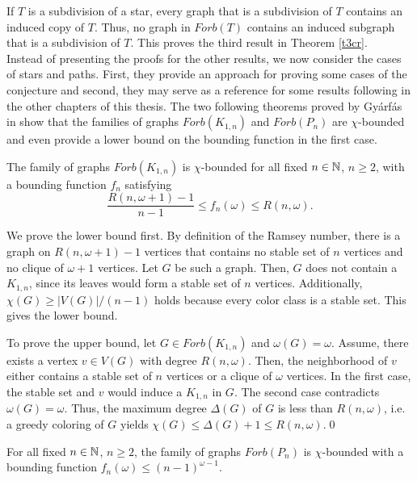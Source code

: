 If $T$ is a subdivision of a star, every graph that is a subdivision of $T$ contains an induced copy of $T$. Thus, no graph in $\textit{Forb}(T)$ contains an induced subgraph that is a subdivision of $T$. This proves the third result in Theorem \ref{t3cr}.\\

Instead of presenting the proofs for the other results, we now consider the cases of stars and paths. First, they provide an approach for proving some cases of the conjecture and second, they may serve as a reference for some results following in the other chapters of this thesis. The two following theorems proved by Gyárfás in \cite{Gy87} show that the families of graphs $\textit{Forb}(K_{1,n})$ and $\textit{Forb}(P_n)$ are $\chi$-bounded and even provide a lower bound on the bounding function in the first case.

\begin{thm} The family of graphs $\textit{Forb}(K_{1,n})$ is $\chi$-bounded for all fixed $n \in\mathbb{N}$, $n\geq 2$, with a bounding function $f_n$ satisfying \[\dfrac{R(n,\omega + 1) - 1}{n-1}\leq f_n(\omega )\leq R(n,\omega ).\] 
\end{thm}
\begin{prf}
We prove the lower bound first. By definition of the Ramsey number, there is a graph on $R(n,\omega + 1) - 1$ vertices that contains no stable set of $n$ vertices and no clique of $\omega + 1$ vertices. Let $G$ be such a graph. Then, $G$ does not contain a $K_{1,n}$, since its leaves would form a stable set of $n$ vertices. Additionally, $\chi (G)\geq |V(G)| /(n-1)$ holds because every color class is a stable set. This gives the lower bound.

To prove the upper bound, let $G \in\textit{Forb} (K_{1,n})$ and $\omega (G) = \omega$. Assume, there exists a vertex $v\in V(G)$ with degree $R(n,\omega)$. Then, the neighborhood of $v$ either contains a stable set of $n$ vertices or a clique of $\omega$ vertices. In the first case, the stable set and $v$ would induce a $K_{1,n}$ in $G$. The second case contradicts $\omega (G) = \omega$. Thus, the maximum degree $\Delta (G)$ of $G$ is less than $R(n,\omega)$, i.e. a greedy coloring of $G$ yields $\chi (G)\leq\Delta (G) + 1\leq R(n,\omega)$.\qed
\end{prf}

\begin{thm}
For all fixed $n\in\mathbb{N}$, $n\geq 2$, the family of graphs $\textit{Forb}(P_n)$ is $\chi$-bounded with a bounding function $f_n(\omega )\leq (n-1)^{\omega - 1}$.
\end{thm}

